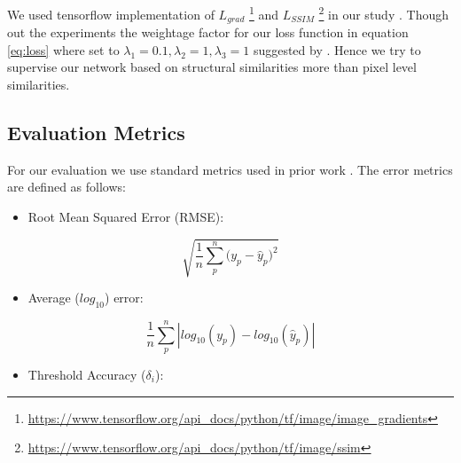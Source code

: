 We used tensorflow implementation of \(L_{grad}\) \footnote{\url{https://www.tensorflow.org/api_docs/python/tf/image/image_gradients}} and \(L_{SSIM}\) \footnote{\url{https://www.tensorflow.org/api_docs/python/tf/image/ssim}}  in our study \cite{tensorflow2015-whitepaper}. Though out the experiments the weightage factor for our loss function in equation \ref{eq:loss} where set to  \(\lambda_{1} = 0.1, \lambda_{2} = 1, \lambda_{3} = 1\) suggested by \cite{Alhashim2018}. Hence we try to supervise our network based on structural similarities more than pixel level similarities. 





\subsection{Evaluation Metrics}
\label{Chapter5:Evaluation_mat}
For our evaluation we use standard metrics used in prior work \cite{Alhashim2018, eigen2014depth}. The error metrics are defined as follows:
\begin{itemize}
    
    \item Root Mean Squared Error (RMSE):
    
\end{itemize}{}

\begin{equation} \label{RMSE}
        \sqrt{\frac{1}{n} \sum_{p}^{n}{(y_{p} - \hat{y}_{p}})^2}
\end{equation}

\begin{itemize}

    \item Average (${log_{10}}$) error: 
    
\end{itemize}{}

\begin{equation} \label{avg_log}
    \frac{1}{n} \sum_{p}^{n} \left|log_{10}(y_{p}) - log_{10}(\hat{y}_{p}) \right|
\end{equation}


\begin{itemize}
    \item Threshold Accuracy (\(\delta_{i}\)): 
\end{itemize}{}

